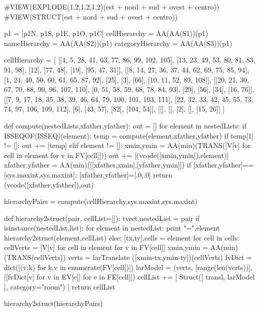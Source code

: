 #VIEW(EXPLODE(1.2,1.2,1.2)(est + nord + sud + ovest + centro))
#VIEW(STRUCT(est + nord + sud + ovest + centro))





p1 = [p1N, p1S, p1E, p1O, p1C]
cellHierarchy = AA(AA(S1))(p1)
nameHierarchy = AA(AA(S2))(p1)
categoryHierarchy = AA(AA(S3))(p1)



cellHierarchy = [
 [[4, 5, 28, 41, 63, 77, 86, 99, 102, 105],
  [13, 23, 49, 53, 80, 81, 83, 91, 98],
  [12],
  [77, 48],
  [19],
  [95, 47, 31]],
 [[8, 14, 27, 36, 37, 44, 62, 69, 75, 85, 94],
  [1, 24, 40, 50, 60, 61, 65, 87, 92],
  [25],
  [3],
  [66],
  [10, 11, 52, 89, 108]],
 [[20, 21, 30, 67, 70, 88, 90, 96, 107, 110],
  [0, 51, 58, 59, 68, 78, 84, 93],
  [29],
  [56],
  [34],
  [16, 76]],
 [[7, 9, 17, 18, 35, 38, 39, 46, 64, 79, 100, 101, 103, 111],
  [22, 32, 33, 42, 45, 55, 73, 74, 97, 106, 109, 112],
  [6],
  [43, 57],
  [82],
  [104, 54]],
 [[], [], [2], [], [15, 26]]
 ]
 
 
def compute(nestedLists,xfather,yfather):
	out = []
	for element in nestedLists:
		if ISSEQOF(ISSEQ)(element):
			temp = compute(element,xfather,yfather)
			if temp[1] != []:
				out += [temp]
		elif element != []:
			xmin,ymin = AA(min)(TRANS([V[v] for cell in element for v in FV[cell]]))
			out += [(vcode([xmin,ymin]),element)]
			xfather,yfather = AA(min)([[xfather,xmin],[yfather,ymin]])
	if [xfather,yfather]==[sys.maxint,sys.maxint]: [xfather,yfather]=[.0,.0]
	return (vcode([xfather,yfather]),out)
		
hierarchyPairs = compute(cellHierarchy,sys.maxint,sys.maxint)


def hierarchy2struct(pair, cellList=[]):
    tvect,nestedList = pair
    if isinstance(nestedList,list):
        for element in nestedList:
        	print "\nelement =",element
            hierarchy2struct(element,cellList)
    else:
        [tx,ty],cells = element
        for cell in cells:
            cellVerts = [V[v] for cell in element for v in FV[cell]]
            xmin,ymin = AA(min)(TRANS(cellVerts))
            verts = larTranslate ([xmin-tx,ymin-ty])(cellVerts)
            fvDict = dict([(v,k) for k,v in enumerate(FV[cell])])
            larModel = (verts, [range(len(verts))], [[fvDict[v] for v in EV[e]] for e in FE[cell]])
            cellList += [ Struct([ transl, larModel ], category="room") ]
    return cellList

hierarchy2struct(hierarchyPairs)


